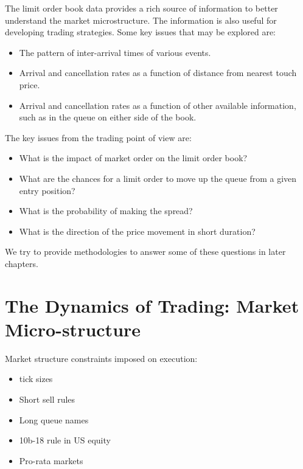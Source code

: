 The limit order book data provides a rich source of information to better understand the market microstructure. The information is also useful for developing trading strategies. Some key issues that may be explored are:
        \begin{itemize}
        \item The pattern of inter-arrival times of various events.
        \item Arrival and cancellation rates as a function of distance from nearest touch price.
        \item Arrival and cancellation rates as a function of other available information, such as in the queue on either side of the book.
        \end{itemize}
The key issues from the trading point of view are:
        \begin{itemize}
        \item What is the impact of market order on the limit order book?
        \item What are the chances for a limit order to move up the queue from a given entry position?
        \item What is the probability of making the spread?
        \item What is the direction of the price movement in short duration?
        \end{itemize}

We try to provide methodologies to answer some of these questions in later chapters.





\section{The Dynamics of Trading: Market Micro-structure}

Market structure constraints imposed on execution:
        \begin{itemize}
        \item tick sizes
        \item Short sell rules
        \item Long queue names
        \item 10b-18 rule in US equity
        \item Pro-rata markets
        \end{itemize}



